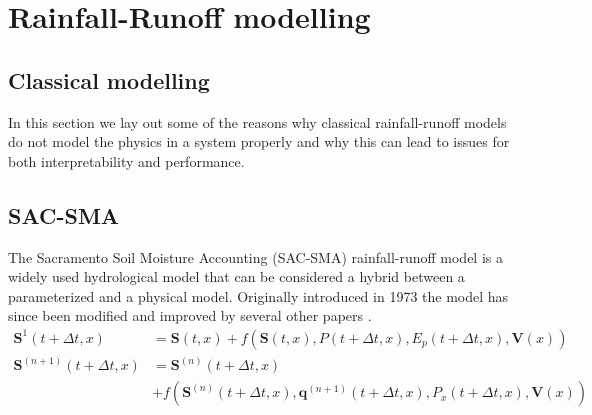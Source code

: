 \section{Rainfall-Runoff modelling}
\subsection{Classical modelling}
In this section we lay out some of the reasons why classical rainfall-runoff 
models do not model the physics in a system properly and why this can lead to issues 
for both interpretability and performance.

\subsection{SAC-SMA}
The Sacramento Soil Moisture Accounting (SAC-SMA) \cite{SAC-SMA} rainfall-runoff model is a widely 
used hydrological model that can be considered a hybrid between a parameterized 
and a physical model.
Originally introduced in 1973 the model has since been modified and improved by 
several other papers \cite{SAC-SMA-physics}.
\begin{align}
    \bm{S}^1(t + \Delta t,x) &= \bm{S}(t,x) + f\left(\bm{S}(t,x),P(t+\Delta t,x),E_p (t+\Delta t, x), \bm{V}(x) \right) \\
    \bm{S}^{(n+1)}(t+\Delta t,x) &= \bm{S}^{(n)}(t+\Delta t, x) \nonumber \\
    &+ f\left( \bm{S}^{(n)}(t+\Delta t, x), \bm{q}^{(n+1)}(t+\Delta t,x),P_x(t+\Delta t,x),\bm{V}(x)  \right)
\end{align}

